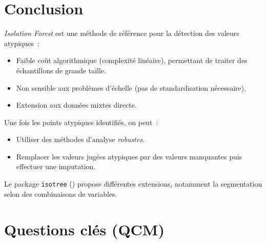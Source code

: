 \documentclass[a4paper,11pt]{article}
\theoremstyle{definition}
\theoremstyle{remark}
\begin{document}
\section{Conclusion}

\emph{Isolation Forest} est une m\'ethode de r\'ef\'erence pour la
d\'etection des valeurs atypiques~:

\begin{itemize}
  \item Faible co\^ut algorithmique (complexit\'e lin\'eaire),
    permettant de traiter des \'echantillons de grande taille.
  \item Non sensible aux probl\`emes d'\'echelle (pas de
    standardisation n\'ecessaire).
  \item Extension aux donn\'ees mixtes directe.
\end{itemize}

Une fois les points atypiques identifi\'es, on peut~:
\begin{itemize}
  \item Utiliser des m\'ethodes d'analyse \emph{robustes}.
  \item Remplacer les valeurs jug\'ees atypiques par des valeurs
    manquantes puis effectuer une imputation.
\end{itemize}

Le package \texttt{isotree} (\cite{Cortes2026}) propose diff\'erentes
extensions, notamment la segmentation selon des combinaisons de
variables.

\section*{Questions cl\'es (QCM)}

\end{document}
